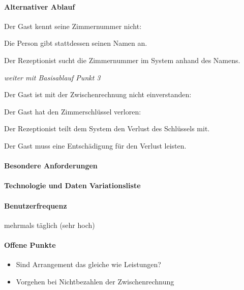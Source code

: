 \paragraph{Alternativer Ablauf}
\begin{longenum}
	\item
	\begin{longenum}
		\item Der \Gls{Gast} kennt seine \Gls{Zimmernummer} nicht:
		\begin{longenum}
			\item Die Person gibt stattdessen seinen Namen an.
			\item Der \Gls{Rezeptionist} sucht die \Gls{Zimmernummer} im System anhand des	Namens.
			\item \emph{weiter mit Basisablauf Punkt 3}
		\end{longenum}
	\end{longenum}
	\item
	\item
	\item
	\item
	\begin{longenum}
		\item Der \Gls{Gast} ist mit der \Gls{Zwischenrechnung} nicht einverstanden:
	\end{longenum}
	\item
	\item
	\item
	\item
	\item
	\begin{longenum}
		\item Der \Gls{Gast} hat den Zimmerschlüssel verloren:
		\begin{longenum}
			\item Der \Gls{Rezeptionist} teilt dem System den Verlust des Schlüssels mit.
			\item Der \Gls{Gast} muss eine Entschädigung für den Verlust leisten.
		\end{longenum}
	\end{longenum}
\end{longenum}

\paragraph{Besondere Anforderungen}

\paragraph{Technologie und Daten Variationsliste}

\paragraph{Benutzerfrequenz}
mehrmals täglich (sehr hoch)

\paragraph{Offene Punkte}
\begin{itemize}
	\item Sind Arrangement das gleiche wie Leistungen?
	\item Vorgehen bei Nichtbezahlen der Zwischenrechnung
\end{itemize}

\newpage
